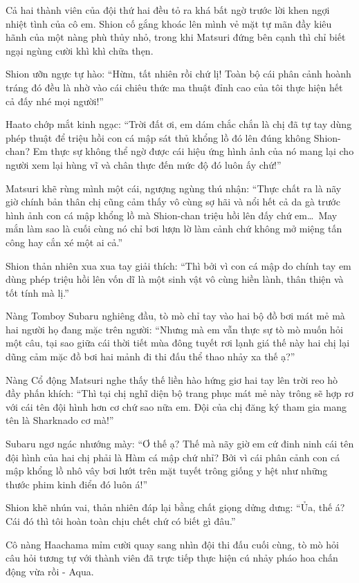 \documentclass[../main.tex]{subfiles}
\begin{document}
Cả hai thành viên của đội thứ hai đều tỏ ra khá bất ngờ trước lời khen ngợi nhiệt tình của cô em. Shion cố gắng khoác lên mình vẻ mặt tự mãn đầy kiêu hãnh của một nàng phù thủy nhỏ, trong khi Matsuri đứng bên cạnh thì chỉ biết ngại ngùng cười khì khì chữa thẹn.

Shion ưỡn ngực tự hào: ``Hừm, tất nhiên rồi chứ lị! Toàn bộ cái phân cảnh hoành tráng đó đều là nhờ vào cái chiêu thức ma thuật đỉnh cao của tôi thực hiện hết cả đấy nhé mọi người!''

Haato chớp mắt kinh ngạc: ``Trời đất ơi, em dám chắc chắn là chị đã tự tay dùng phép thuật để triệu hồi con cá mập sát thủ khổng lồ đó lên đúng không Shion-chan? Em thực sự không thể ngờ được cái hiệu ứng hình ảnh của nó mang lại cho người xem lại hùng vĩ và chân thực đến mức độ đó luôn ấy chứ!''

Matsuri khẽ rùng mình một cái, ngượng ngùng thú nhận: ``Thực chất ra là nãy giờ chính bản thân chị cũng cảm thấy vô cùng sợ hãi và nổi hết cả da gà trước hình ảnh con cá mập khổng lồ mà Shion-chan triệu hồi lên đấy chứ em\dots\ May mắn làm sao là cuối cùng nó chỉ bơi lượn lờ làm cảnh chứ không mở miệng tấn công hay cắn xé một ai cả.''

Shion thản nhiên xua xua tay giải thích: ``Thì bởi vì con cá mập do chính tay em dùng phép triệu hồi lên vốn dĩ là một sinh vật vô cùng hiền lành, thân thiện và tốt tính mà lị.''

Nàng Tomboy Subaru nghiêng đầu, tò mò chỉ tay vào hai bộ đồ bơi mát mẻ mà hai người họ đang mặc trên người: ``Nhưng mà em vẫn thực sự tò mò muốn hỏi một câu, tại sao giữa cái thời tiết mùa đông tuyết rơi lạnh giá thế này hai chị lại dũng cảm mặc đồ bơi hai mảnh đi thi đấu thể thao nhảy xa thế ạ?''

Nàng Cổ động Matsuri nghe thấy thế liền hào hứng giơ hai tay lên trời reo hò đầy phấn khích: ``Thì tại chị nghĩ diện bộ trang phục mát mẻ này trông sẽ hợp rơ với cái tên đội hình hơn cơ chứ sao nữa em. Đội của chị đăng ký tham gia mang tên là Sharknado cơ mà!''

Subaru ngơ ngác nhướng mày: ``Ơ thế ạ? Thế mà nãy giờ em cứ đinh ninh cái tên đội hình của hai chị phải là Hàm cá mập chứ nhỉ? Bởi vì cái phân cảnh con cá mập khổng lồ nhô vây bơi lướt trên mặt tuyết trông giống y hệt như những thước phim kinh điển đó luôn á!''

Shion khẽ nhún vai, thản nhiên đáp lại bằng chất giọng dửng dưng: ``Ủa, thế á? Cái đó thì tôi hoàn toàn chịu chết chứ có biết gì đâu.''

Cô nàng Haachama mỉm cười quay sang nhìn đội thi đấu cuối cùng, tò mò hỏi câu hỏi tương tự với thành viên đã trực tiếp thực hiện cú nhảy pháo hoa chấn động vừa rồi - Aqua.
\end{document}

